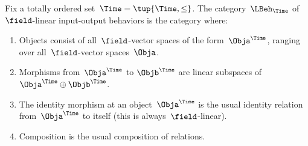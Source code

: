     \begin{definition}
        Fix a totally ordered set~$\Time = \tup{\Time, \leq}$.
        The category~$\LBeh_\Time$ of~$\field$-linear input-output behaviors is the category where:
        \begin{enumerate}
            \item Objects consist of all~$\field$-vector spaces of the form~$\Obja^\Time$, ranging over all~$\field$-vector spaces~$\Obja$.
            \item Morphisms from~$\Obja^\Time$ to $\Objb^\Time$ are linear subspaces of~$\Obja^\Time \oplus \Objb^\Time$.
            \item The identity morphism at an object~$\Obja^\Time$ is the usual identity relation from~$\Obja^\Time$ to itself (this is always~$\field$-linear).
            \item Composition is the usual composition of relations.
        \end{enumerate}
    \end{definition}

